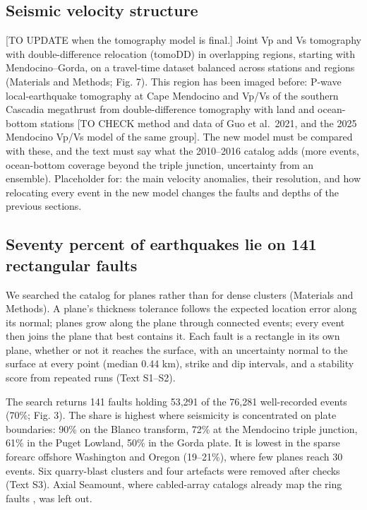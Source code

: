 \documentclass[11pt]{article}
\begin{document}
\subsection{Seismic velocity
structure}\label{seismic-velocity-structure}

{[}TO UPDATE when the tomography model is final.{]} Joint Vp and Vs
tomography with double-difference relocation (tomoDD) in overlapping
regions, starting with Mendocino--Gorda, on a travel-time dataset
balanced across stations and regions (Materials and Methods; Fig. 7).
This region has been imaged before: P-wave local-earthquake tomography
at Cape Mendocino \citep{Verdonck1994} and Vp/Vs of the southern
Cascadia megathrust from double-difference tomography with land and
ocean-bottom stations \citep{Guo2021} {[}TO CHECK method and data of Guo
et al.~2021, and the 2025 Mendocino Vp/Vs model of the same group{]}.
The new model must be compared with these, and the text must say what
the 2010--2016 catalog adds (more events, ocean-bottom coverage beyond
the triple junction, uncertainty from an ensemble). Placeholder for: the
main velocity anomalies, their resolution, and how relocating every
event in the new model changes the faults and depths of the previous
sections.

\subsection{Seventy percent of earthquakes lie on 141 rectangular
faults}\label{seventy-percent-of-earthquakes-lie-on-141-rectangular-faults}

We searched the catalog for planes rather than for dense clusters
(Materials and Methods). A plane's thickness tolerance follows the
expected location error along its normal; planes grow along the plane
through connected events; every event then joins the plane that best
contains it. Each fault is a rectangle in its own plane, whether or not
it reaches the surface, with an uncertainty normal to the surface at
every point (median 0.44 km), strike and dip intervals, and a stability
score from repeated runs (Text S1--S2).

The search returns 141 faults holding 53,291 of the 76,281 well-recorded
events (70\%; Fig. 3). The share is highest where seismicity is
concentrated on plate boundaries: 90\% on the Blanco transform, 72\% at
the Mendocino triple junction, 61\% in the Puget Lowland, 50\% in the
Gorda plate. It is lowest in the sparse forearc offshore Washington and
Oregon (19--21\%), where few planes reach 30 events. Six quarry-blast
clusters and four artefacts were removed after checks (Text S3). Axial
Seamount, where cabled-array catalogs already map the ring faults
\citep{Wilcock2016, Waldhauser2020}, was left out.
\end{document}
